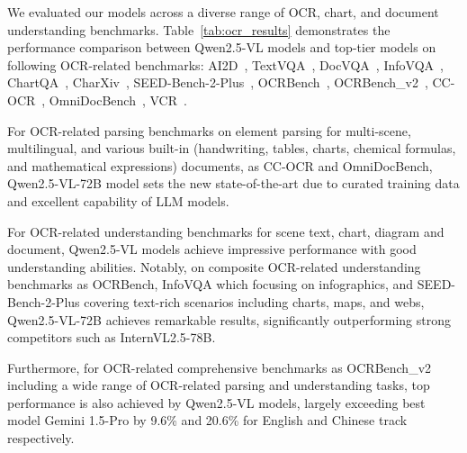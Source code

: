 We evaluated our models across a diverse range of OCR, chart, and document understanding benchmarks. Table~\ref{tab:ocr_results} demonstrates the performance comparison between Qwen2.5-VL models and top-tier models on following OCR-related benchmarks: AI2D~\citep{kembhavi2016diagram}, TextVQA~\citep{textvqa}, DocVQA~\citep{docvqa}, InfoVQA~\citep{Mathew2021InfographicVQA}, ChartQA~\citep{masry2022chartqa}, CharXiv~\citep{wang2024charxiv}, SEED-Bench-2-Plus~\citep{li2024seed2plus}, OCRBench~\citep{liu2024ocrbenchhiddenmysteryocr},  OCRBench\_v2~\citep{fu2024ocrbenchv2improvedbenchmark}, CC-OCR~\citep{yang2024ccocrcomprehensivechallengingocr}, OmniDocBench~\citep{ouyang2024omnidocbenchbenchmarkingdiversepdf}, VCR~\citep{zhang2024vcr}.


For OCR-related parsing benchmarks on element parsing for multi-scene, multilingual, and various built-in (handwriting, tables, charts, chemical formulas, and mathematical expressions) documents, as CC-OCR and OmniDocBench, Qwen2.5-VL-72B model sets the new state-of-the-art due to curated training data and excellent capability of LLM models.

For OCR-related understanding benchmarks for scene text, chart, diagram and document, Qwen2.5-VL models achieve impressive performance with good understanding abilities. Notably, on composite OCR-related understanding benchmarks as OCRBench, InfoVQA which focusing on infographics, and SEED-Bench-2-Plus covering text-rich scenarios including charts, maps, and webs, Qwen2.5-VL-72B
achieves remarkable results, significantly outperforming strong competitors such as InternVL2.5-78B.

Furthermore, for OCR-related comprehensive benchmarks as OCRBench\_v2 including a wide range of OCR-related parsing and understanding tasks, top performance is also achieved by Qwen2.5-VL models, largely exceeding best model Gemini 1.5-Pro by 9.6\% and 20.6\% for English and Chinese track respectively. %

